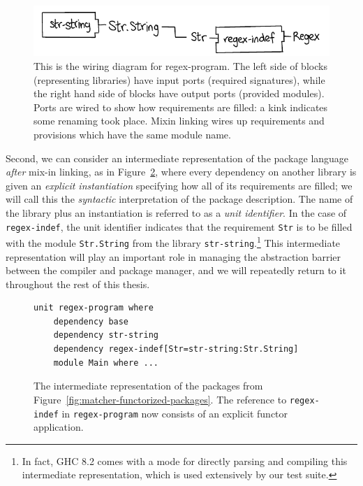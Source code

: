 \begin{figure}
\center%
\includegraphics{figures/regex-indef-instantiated.pdf}
\caption{This is the wiring diagram for regex-program. The left side of blocks
(representing libraries) have input ports (required signatures), while the right hand side
of blocks have output ports (provided modules). Ports are wired to show how requirements are
filled: a kink indicates some renaming took place. Mixin linking wires up requirements
and provisions which have the same module name.}
\label{fig:regex-indef-instantiated}
\end{figure}

Second, we can consider an intermediate representation of the package language
\emph{after} mix-in linking,
as in Figure~\ref{fig:matcher-bkp}, where every dependency on another library
is given an \emph{explicit instantiation} specifying how all of its requirements
are filled; we will call this the \emph{syntactic} interpretation of
the package description. The name of the library plus an instantiation is referred
to as a \emph{unit identifier}.  In the case of \verb|regex-indef|, the
unit identifier indicates that the requirement \verb|Str| is to be filled
with the module \verb|Str.String| from the library \verb|str-string|.\footnote{In
fact, GHC 8.2 comes with a mode for directly parsing and compiling this intermediate
representation, which is used extensively by our test suite.}  This intermediate
representation will play an important role in managing the abstraction barrier
between the compiler and package manager, and we will repeatedly return to
it throughout the rest of this thesis.

\begin{figure}
\begin{lstlisting}
unit regex-program where
    dependency base
    dependency str-string
    dependency regex-indef[Str=str-string:Str.String]
    module Main where ...
\end{lstlisting}
\caption{The intermediate representation of the packages from Figure~\ref{fig:matcher-functorized-packages}.
The reference to \texttt{regex-indef} in \texttt{regex-program} now consists of an explicit functor application.}
\label{fig:matcher-bkp}
\end{figure}

